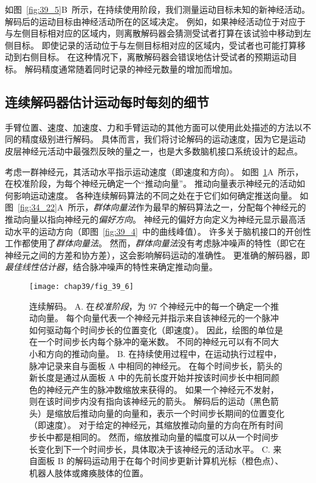 如图~\ref{fig:39_5}B~所示，在持续使用阶段，我们测量运动目标未知的新神经活动。
解码后的运动目标由神经活动所在的区域决定。
例如，如果神经活动位于对应于与左侧目标相对应的区域内，则离散解码器会猜测受试者打算在该试验中移动到左侧目标。 
即使记录的活动位于与左侧目标相对应的区域内，受试者也可能打算移动到右侧目标。
在这种情况下，离散解码器会错误地估计受试者的预期运动目标。
解码精度通常随着同时记录的神经元数量的增加而增加。



\subsection{连续解码器估计运动每时每刻的细节}

手臂位置、速度、加速度、力和手臂运动的其他方面可以使用此处描述的方法以不同的精度级别进行解码。
具体而言，我们将讨论解码的运动速度，因为它是运动皮层神经元活动中最强烈反映的量之一，也是大多数脑机接口系统设计的起点。


考虑一群神经元，其活动水平指示运动速度（即速度和方向）。
如图~\ref{fig:39_6}A~所示，在校准阶段，为每个神经元确定一个“推动向量”。
推动向量表示神经元的活动如何影响运动速度。
各种连续解码算法的不同之处在于它们如何确定推送向量。
如图~\ref{fig:34_22}A~所示，\textit{群体向量法}作为最早的解码算法之一，分配每个神经元的推动向量以指向神经元的\textit{偏好方向}。
神经元的偏好方向定义为神经元显示最高活动水平的运动方向（即图~\ref{fig:39_4}~中的曲线峰值）。
许多关于脑机接口的开创性工作都使用了\textit{群体向量法}。
然而，\textit{群体向量法}没有考虑脉冲噪声的特性（即它在神经元之间的方差和协方差），这会影响解码运动的准确性。
更准确的解码器，即\textit{最佳线性估计器}，结合脉冲噪声的特性来确定推动向量。


\begin{figure}[htbp]
	\centering
	\texttt{[image: chap39/fig\_39\_6]}
	\caption{连续解码。
		A. 在\textit{校准阶段}，为 97 个神经元中的每一个确定一个推动向量。
		每个向量代表一个神经元并指示来自该神经元的一个脉冲如何驱动每个时间步长的位置变化（即速度）。
		因此，绘图的单位是在一个时间步长内每个脉冲的毫米数。
		不同的神经元可以有不同大小和方向的推动向量。
		B. 在持续使用过程中，在运动执行过程中，脉冲记录来自与面板 A 中相同的神经元。
		在每个时间步长，箭头的新长度是通过从面板 A 中的先前长度开始并按该时间步长中相同颜色的神经元产生的脉冲数缩放来获得的。
		如果一个神经元不发射，则在该时间步内没有指向该神经元的箭头。
		解码后的运动（黑色箭头）是缩放后推动向量的向量和，表示一个时间步长期间的位置变化（即速度）。
		对于给定的神经元，其缩放推动向量的方向在所有时间步长中都是相同的。
		然而，缩放推动向量的幅度可以从一个时间步长变化到下一个时间步长，具体取决于该神经元的活动水平。
		C. 来自面板 B 的解码运动用于在每个时间步更新计算机光标（橙色点）、机器人肢体或瘫痪肢体的位置。}
	\label{fig:39_6}
\end{figure}



